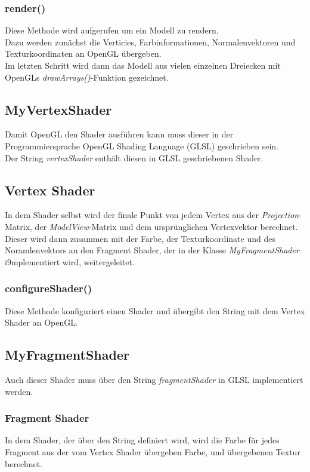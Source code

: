 \subsubsection{render()}
Diese Methode wird aufgerufen um ein Modell zu rendern. \\
Dazu werden zunächst die Verticies, Farbinformationen, Normalenvektoren und Texturkoordinaten an OpenGL übergeben. \\
Im letzten Schritt wird dann das Modell aus vielen einzelnen Dreiecken mit OpenGLs \textit{drawArrays()}-Funktion gezeichnet.

\subsection{MyVertexShader}
Damit OpenGL den Shader ausführen kann muss dieser in der Programmiersprache OpenGL Shading Language (GLSL) geschrieben sein. \\
Der String \textit{vertexShader} enthält diesen in GLSL geschriebenen Shader.

\subsection{Vertex Shader}
In dem Shader selbst wird der finale Punkt von jedem Vertex aus der \textit{Projection}-Matrix, der \textit{ModelView}-Matrix und dem ursprünglichen Vertexvektor berechnet. Dieser wird dann zusammen mit der Farbe, der Texturkoordinate und des Noramlenvektors an den Fragment Shader, der in der Klasse \textit{MyFragmentShader} i9mplementiert wird, weitergeleitet.

\subsubsection{configureShader()}
Diese Methode konfiguriert einen Shader und übergibt den String mit dem Vertex Shader an OpenGL.


\subsection{MyFragmentShader}
Auch dieser Shader muss über den String \textit{fragmentShader} in GLSL implementiert werden.

\subsubsection{Fragment Shader}
In dem Shader, der über den String definiert wird, wird die Farbe für jedes Fragment aus der vom Vertex Shader übergeben Farbe, und übergebenen Textur berechnet. 

